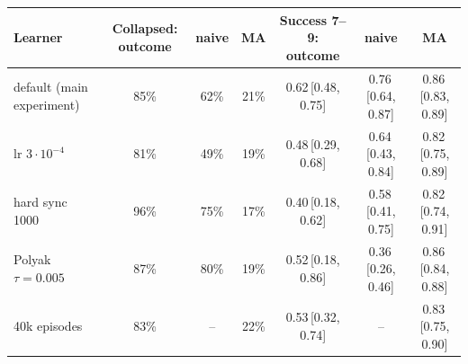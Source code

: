 \begin{tabular}{lcccccc}
\toprule
Learner & Collapsed: outcome & naive & MA & Success 7--9: outcome & naive & MA \\
\midrule
default (main experiment) & 85\% & 62\% & 21\% & 0.62\,{\scriptsize[0.48, 0.75]} & 0.76\,{\scriptsize[0.64, 0.87]} & 0.86\,{\scriptsize[0.83, 0.89]} \\
lr $3{\cdot}10^{-4}$ & 81\% & 49\% & 19\% & 0.48\,{\scriptsize[0.29, 0.68]} & 0.64\,{\scriptsize[0.43, 0.84]} & 0.82\,{\scriptsize[0.75, 0.89]} \\
hard sync 1000 & 96\% & 75\% & 17\% & 0.40\,{\scriptsize[0.18, 0.62]} & 0.58\,{\scriptsize[0.41, 0.75]} & 0.82\,{\scriptsize[0.74, 0.91]} \\
Polyak $\tau{=}0.005$ & 87\% & 80\% & 19\% & 0.52\,{\scriptsize[0.18, 0.86]} & 0.36\,{\scriptsize[0.26, 0.46]} & 0.86\,{\scriptsize[0.84, 0.88]} \\
40k episodes & 83\% & -- & 22\% & 0.53\,{\scriptsize[0.32, 0.74]} & -- & 0.83\,{\scriptsize[0.75, 0.90]} \\
\bottomrule
\end{tabular}
